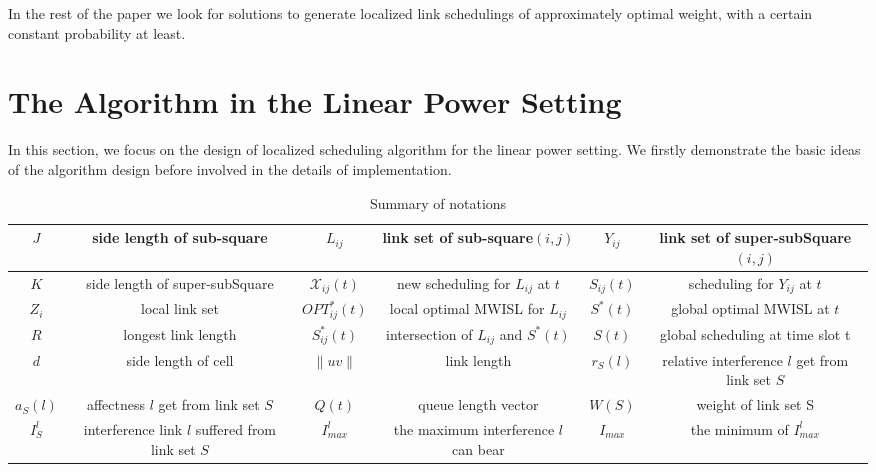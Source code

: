 \documentclass[journal]{IEEEtran}
\begin{document}
In the rest of the paper we look for solutions to generate localized link
schedulings of approximately optimal weight, with  a certain constant probability at least.

\section{The Algorithm in the Linear Power Setting}

In this section, we focus on the design of localized scheduling algorithm for the linear power setting. We firstly demonstrate the basic ideas of the algorithm design before involved in the details of implementation.
\vspace*{-1\baselineskip}


\begin{table*}[t]\setlength{\tabcolsep}{3pt}
\begin{center}
\caption{Summary of notations}
\label{notations}
\begin{tabular}{c|c|c|c|c|c}
  \hline
$J$ & side length of sub-square & $L_{ij}$ & link set of sub-square$(i,j)$ & $Y_{ij}$ & link set of super-subSquare$(i,j)$\\
    \hline
 $K$ & side length of super-subSquare & $\mathcal{X}_{ij}(t)$ & new scheduling for $L_{ij}$ at $t$ & $S_{ij}(t)$ & scheduling for $Y_{ij}$ at $t$\\
  \hline
 $Z_i$ & local link set   & $OPT_{ij}^*(t)$ & local optimal MWISL for $L_{ij}$ & $S^{\ast}(t)$ & global optimal MWISL at $t$\\
 \hline
 $R$ & longest link length   & $S_{ij}^{\ast}(t)$ & intersection of $L_{ij}$ and $S^{\ast}(t)$
 & $S(t)$ & global scheduling at time slot t\\

\hline
  $d$ & side length of cell & $\|uv\|$ & link length & $r_S(l)$ & relative interference $l$ get from link set $S$\\
  \hline
  $a_S(l)$ & affectness $l$ get from link set $S$ & $Q(t)$ & queue length vector &$W(S)$ &weight of link set S \\
  \hline
  $I_S^l$ & interference  link $l$ suffered from link set $S$ &
  $I_{max}^l$ & the maximum interference $l$ can bear & $I_{max}$ & the minimum of $I_{max}^l$\\

  \hline
\end{tabular}
\end{center}\vspace{-10pt}
\end{table*}
\end{document}
